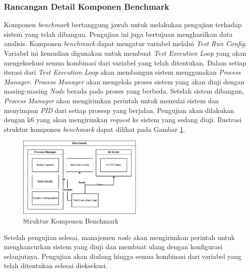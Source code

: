 \subsubsection{Rancangan Detail Komponen Benchmark}
\label{subsubsection:detail-data-benchmark}

Komponen \textit{benchmark} bertanggung jawab untuk melakukan pengujian terhadap sistem yang telah dibangun. Pengujian ini juga bertujuan menghasilkan data analisis. Komponen \textit{benchmark} dapat mengatur variabel melalui \textit{Test Run Config}. Variabel ini kemudian digunakan untuk membuat \textit{Test Execution Loop} yang akan mengeksekusi semua kombinasi dari variabel yang telah ditentukan. Dalam setiap iterasi dari \textit{Test Execution Loop} akan membangun sistem menggunakan \textit{Process Manager}. \textit{Process Manager} akan mengelola proses sistem yang akan diuji dengan masing-masing \textit{Node} berada pada proses yang berbeda. Setelah sistem dibangun, \textit{Process Manager} akan mengirimkan perintah untuk memulai sistem dan menyimpan \textit{PID} dari setiap prosesp yang berjalan. Pengujian akan dilakukan dengan k6 yang akan mengirimkan \textit{request} ke sistem yang sedang diuji. Ilustrasi struktur komponen \textit{benchmark} dapat dilihat pada Gambar \ref{fig:benchmark-structure}.

\begin{figure}[ht]
    \centering
    \includegraphics[width=0.55\textwidth]{resources/chapter-3/benchmark-architecture.png}
    \caption{Struktur Komponen Benchmark}
    \label{fig:benchmark-structure}
\end{figure}

Setelah pengujian selesai, manajemen \textit{node} akan mengirimkan perintah untuk menghancurkan sistem yang diuji dan membuat ulang dengan konfigurasi selanjutnya. Pengujian akan diulang hingga semua kombinasi dari variabel yang telah ditentukan selesai dieksekusi.